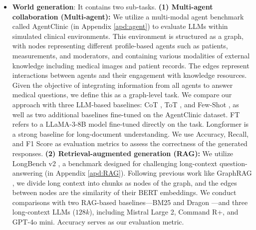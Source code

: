 \begin{itemize}[leftmargin=1em, itemsep=0pt]
\item \textbf{World generation}: It contains two sub-tasks. \textbf{(1) Multi-agent collaboration (Multi-agent):} We utilize a multi-modal agent benchmark called AgentClinic \citep{schmidgall2024agentclinic} (in Appendix \ref{apd:agent}) to evaluate LLMs within simulated clinical environments. This environment is structured as a graph, with nodes representing different profile-based agents such as patients, measurements, and moderators, and containing various modalities of external knowledge including medical images and patient records. The edges represent interactions between agents and their engagement with knowledge resources. Given the objective of integrating information from all agents to answer medical questions, we define this as a graph-level task. We compare our approach with three LLM-based baselines: CoT \citep{wei2022chain}, ToT \citep{yao2024tree}, and Few-Shot \citep{madotto2021few}, as well as two additional baselines fine-tuned on the AgentClinic dataset. FT refers to a LLaMA-3-8B model fine-tuned directly on the task. Longformer \citep{beltagy2020longformer} is a strong baseline for long-document understanding. We use Accuracy, Recall, and F1 Score as evaluation metrics to assess the correctness of the generated responses.  \textbf{(2) Retrieval-augmented generation (RAG):} We utilize LongBench v2 \citep{bai2024longbench}, a benchmark designed for challenging long-context question-answering (in Appendix \ref{apd:RAG}). %
Following previous work like GraphRAG \citep{edge2024local}, we divide long context into chunks as nodes of the graph, and the edges between nodes are the similarity of their BERT embeddings. We conduct comparisons with two RAG-based baselines—BM25 \citep{robertson2009probabilistic} and Dragon \citep{lin2023train}—and three long-context LLMs ($128k$), including Mistral Large 2, Command R+, and GPT-4o mini. Accuracy serves as our evaluation metric.


\end{itemize}
